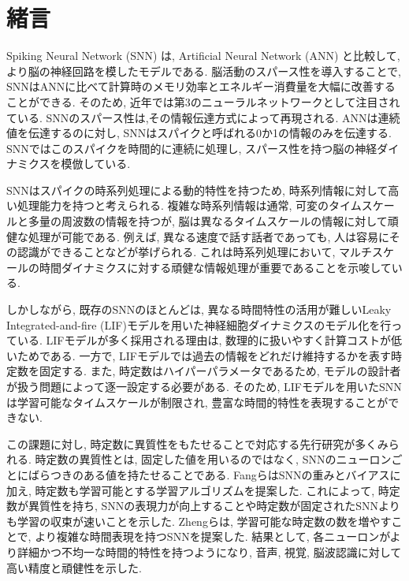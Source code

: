 \section{緒言}
Spiking Neural Network (SNN) は, Artificial Neural Network (ANN) と比較して, より脳の神経回路を模したモデルである\cite{TAVANAEI201947}.
脳活動のスパース性を導入することで, SNNはANNに比べて計算時のメモリ効率とエネルギー消費量を大幅に改善することができる.
そのため, 近年では第3のニューラルネットワークとして注目されている\cite{Henkes2024}.
SNNのスパース性は,その情報伝達方式によって再現される.
ANNは連続値を伝達するのに対し, SNNはスパイクと呼ばれる0か1の情報のみを伝達する.
SNNではこのスパイクを時間的に連続に処理し, スパース性を持つ脳の神経ダイナミクスを模倣している.

SNNはスパイクの時系列処理による動的特性を持つため, 時系列情報に対して高い処理能力を持つと考えられる\cite{zheng2024temporal}.
複雑な時系列情報は通常, 可変のタイムスケールと多量の周波数の情報を持つが, 脳は異なるタイムスケールの情報に対して頑健な処理が可能である\cite{10.1162/jocn_a_01615}.
例えば, 異なる速度で話す話者であっても, 人は容易にその認識ができることなどが挙げられる.
これは時系列処理において, マルチスケールの時間ダイナミクスに対する頑健な情報処理が重要であることを示唆している.

しかしながら, 既存のSNNのほとんどは, 異なる時間特性の活用が難しいLeaky Integrated-and-fire (LIF)モデルを用いた神経細胞ダイナミクスのモデル化を行っている\cite{dayan2003theoretical}.
LIFモデルが多く採用される理由は, 数理的に扱いやすく計算コストが低いためである.
一方で, LIFモデルでは過去の情報をどれだけ維持するかを表す時定数を固定する.
また, 時定数はハイパーパラメータであるため, モデルの設計者が扱う問題によって逐一設定する必要がある.
そのため, LIFモデルを用いたSNNは学習可能なタイムスケールが制限され, 豊富な時間的特性を表現することができない.

この課題に対し, 時定数に異質性をもたせることで対応する先行研究が多くみられる\cite{10.1145/3407197.3407225}\cite{ParametricSNN}.
時定数の異質性とは, 固定した値を用いるのではなく, SNNのニューロンごとにばらつきのある値を持たせることである.
Fangら\cite{ParametricSNN}はSNNの重みとバイアスに加え, 時定数も学習可能とする学習アルゴリズムを提案した.
これによって, 時定数が異質性を持ち, SNNの表現力が向上することや時定数が固定されたSNNよりも学習の収束が速いことを示した.
Zhengら\cite{zheng2024temporal}は, 学習可能な時定数の数を増やすことで, より複雑な時間表現を持つSNNを提案した.
結果として, 各ニューロンがより詳細かつ不均一な時間的特性を持つようになり, 音声, 視覚, 脳波認識に対して高い精度と頑健性を示した.

